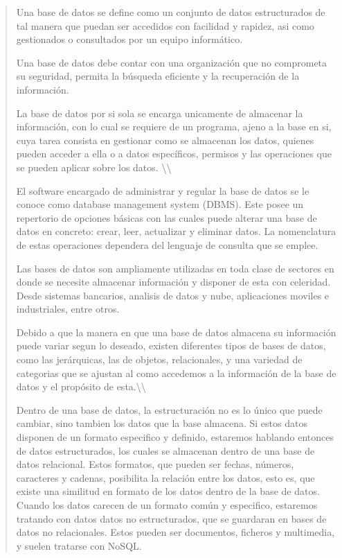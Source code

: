 \documentclass[14pt]{extarticle}
\begin{document}
\begin{quote}
Una base de datos se define como un conjunto de datos estructurados de
tal manera que puedan ser accedidos con facilidad y rapidez, asi como
gestionados o consultados por un equipo informático.

Una base de datos debe contar con una organización que no comprometa su
seguridad, permita la búsqueda eficiente y la recuperación de la
información.

La base de datos por si sola se encarga unicamente de almacenar la
información, con lo cual se requiere de un programa, ajeno a la base en
si, cuya tarea consista en gestionar como se almacenan los datos,
quienes pueden acceder a ella o a datos específicos, permisos y las
operaciones que se pueden aplicar sobre los datos.
\textbackslash\textbackslash{}

El software encargado de administrar y regular la base de datos se le
conoce como database management system (DBMS). Este posee un repertorio
de opciones básicas con las cuales puede alterar una base de datos en
concreto: crear, leer, actualizar y eliminar datos. La nomenclatura de
estas operaciones dependera del lenguaje de consulta que se emplee.

Las bases de datos son ampliamente utilizadas en toda clase de sectores
en donde se necesite almacenar información y disponer de esta con
celeridad. Desde sistemas bancarios, analisis de datos y nube,
aplicaciones moviles e industriales, entre otros.

Debido a que la manera en que una base de datos almacena su información
puede variar segun lo deseado, existen diferentes tipos de bases de
datos, como las jerárquicas, las de objetos, relacionales, y una
variedad de categorias que se ajustan al como accedemos a la información
de la base de datos y el propósito de
esta.\textbackslash\textbackslash{}

Dentro de una base de datos, la estructuración no es lo único que puede
cambiar, sino tambien los datos que la base almacena. Si estos datos
disponen de un formato especifico y definido, estaremos hablando
entonces de datos estructurados, los cuales se almacenan dentro de una
base de datos relacional. Estos formatos, que pueden ser fechas,
números, caracteres y cadenas, posibilita la relación entre los datos,
esto es, que existe una similitud en formato de los datos dentro de la
base de datos. Cuando los datos carecen de un formato común y
especifico, estaremos tratando con datos datos no estructurados, que se
guardaran en bases de datos no relacionales. Estos pueden ser
documentos, ficheros y multimedia, y suelen tratarse con NoSQL.


\end{quote}
\end{document}
